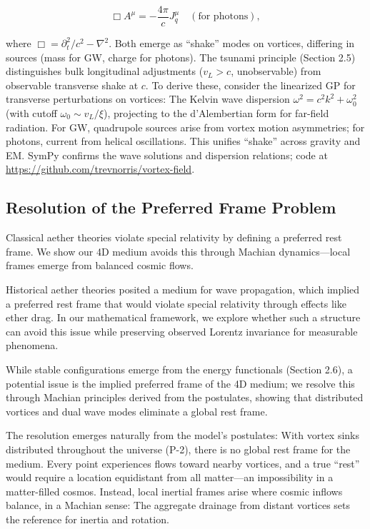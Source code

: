 \begin{equation}
\Box A^\mu = -\frac{4\pi}{c} J_q^\mu \quad (\text{for photons}),
\end{equation}

where $\Box = \partial_t^2 / c^2 - \nabla^2$. Both emerge as ``shake'' modes on vortices, differing in sources (mass for GW, charge for photons). The tsunami principle (Section 2.5) distinguishes bulk longitudinal adjustments ($v_L > c$, unobservable) from observable transverse shake at $c$. To derive these, consider the linearized GP for transverse perturbations on vortices: The Kelvin wave dispersion $\omega^2 = c^2 k^2 + \omega_0^2$ (with cutoff $\omega_0 \sim v_L / \xi$), projecting to the d'Alembertian form for far-field radiation. For GW, quadrupole sources arise from vortex motion asymmetries; for photons, current from helical oscillations. This unifies ``shake'' across gravity and EM. SymPy confirms the wave solutions and dispersion relations; code at \url{https://github.com/trevnorris/vortex-field}.

\subsection{Resolution of the Preferred Frame Problem}

Classical aether theories violate special relativity by defining a preferred rest frame. We show our 4D medium avoids this through Machian dynamics---local frames emerge from balanced cosmic flows.

Historical aether theories posited a medium for wave propagation, which implied a preferred rest frame that would violate special relativity through effects like ether drag. In our mathematical framework, we explore whether such a structure can avoid this issue while preserving observed Lorentz invariance for measurable phenomena.

While stable configurations emerge from the energy functionals (Section 2.6), a potential issue is the implied preferred frame of the 4D medium; we resolve this through Machian principles derived from the postulates, showing that distributed vortices and dual wave modes eliminate a global rest frame.

The resolution emerges naturally from the model's postulates: With vortex sinks distributed throughout the universe (P-2), there is no global rest frame for the medium. Every point experiences flows toward nearby vortices, and a true ``rest'' would require a location equidistant from all matter---an impossibility in a matter-filled cosmos. Instead, local inertial frames arise where cosmic inflows balance, in a Machian sense: The aggregate drainage from distant vortices sets the reference for inertia and rotation.

